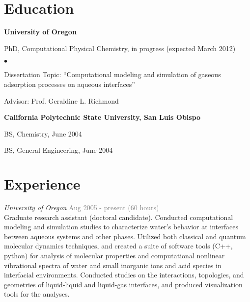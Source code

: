 \documentclass[margin,line]{res}
\newenvironment{list1}{
  \begin{list}{\ding{113}}{%
      \setlength{\itemsep}{0in}
      \setlength{\parsep}{0in} \setlength{\parskip}{0in}
      \setlength{\topsep}{0in} \setlength{\partopsep}{0in} 
      \setlength{\leftmargin}{0.15in}}}{\end{list}}
\newenvironment{list2}{
  \begin{list}{$\bullet$}{%
      \setlength{\itemsep}{0in}
      \setlength{\parsep}{0in} \setlength{\parskip}{0in}
      \setlength{\topsep}{0in} \setlength{\partopsep}{0in} 
      \setlength{\leftmargin}{0.2in}}}{\end{list}}
\begin{document}
\begin{resume}

\section{\sc Education}
{\bf University of Oregon}\\
\vspace*{-.1in}
\begin{list1}
\item[] {\sc PhD}, Computational Physical Chemistry, in progress (expected March 2012) 
\begin{list2}
\item[] Dissertation Topic:  ``Computational modeling and simulation of gaseous adsorption processes on aqueous interfaces''
\item[] Advisor: Prof. Geraldine L. Richmond
\end{list2}
\end{list1}

{\bf California Polytechnic State University, San Luis Obispo}\\
\vspace*{-.1in}
\begin{list1}
\item[] {\sc BS}, Chemistry, June 2004
\item[] {\sc BS}, General Engineering, June 2004
\end{list1}

\section{\sc Experience}

\emph{University of Oregon} \hfill { \textcolor{gray}{Aug 2005 - present (60 hours)} }\\
\nopagebreak
Graduate research assistant (doctoral candidate).  Conducted computational modeling and simulation studies to characterize water's behavior at interfaces between aqueous systems and other phases. Utilized both classical and quantum molecular dynamics techniques, and created a suite of software tools (C++, python) for analysis of molecular properties and computational nonlinear vibrational spectra of water and small inorganic ions and acid species in interfacial environments. Conducted studies on the interactions, topologies, and geometries of liquid-liquid and liquid-gas interfaces, and produced visualization tools for the analyses.


\end{resume}
\end{document}
